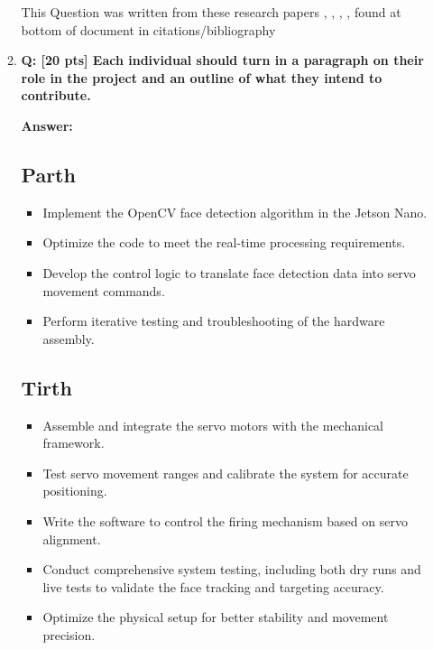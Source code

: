 \documentclass[a4paper,11pt]{article}%
\newenvironment{qanda}{\setlength{\parindent}{0pt}}{\bigskip}
\newcommand{\Q}{\bigskip\bfseries Q: }
\newcommand{\A}{\par\textbf{Answer: } \normalfont}
\begin{document}
\begin{qanda}
\begin{enumerate}
\begin{enumerate}
				      This Question was written from these research papers \citep{inbook},  \citet{article}, \citet{opencv}, \citet{mdpi}, found at bottom of document in citations/bibliography

				     


				\item \Q [20 pts] Each individual should turn in a paragraph on their role in the project and an
				      outline of what they intend to contribute.
					  \A
				      \subsection{Parth}
				      \begin{itemize}
					      \item Implement the OpenCV face detection algorithm in the Jetson Nano.
					      \item  Optimize the code to meet the real-time processing requirements.
					      \item Develop the control logic to translate face detection data into servo movement commands.
					      \item Perform iterative testing and troubleshooting of the hardware assembly.
				      \end{itemize}

				      \subsection{Tirth}
				      \begin{itemize}
					      \item Assemble and integrate the servo motors with the mechanical framework.
					      \item Test servo movement ranges and calibrate the system for accurate positioning.
					      \item Write the software to control the firing mechanism based on servo alignment.
					      \item Conduct comprehensive system testing, including both dry runs and live tests to validate the face tracking and targeting accuracy.
					      \item Optimize the physical setup for better stability and movement precision.
				      \end{itemize}


\end{enumerate}
\end{enumerate}
\end{qanda}
\end{document}
